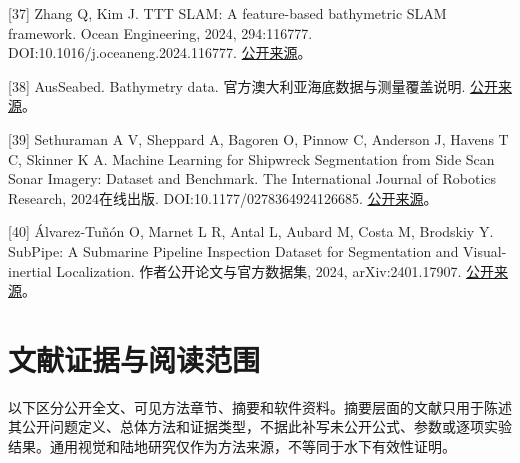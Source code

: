 {[}37{]} Zhang Q, Kim J. TTT SLAM: A feature-based bathymetric SLAM framework. Ocean Engineering, 2024, 294:116777. DOI:10.1016/j.oceaneng.2024.116777. \href{https://www.sciencedirect.com/science/article/pii/S0029801824001148}{公开来源}。

{[}38{]} AusSeabed. Bathymetry data. 官方澳大利亚海底数据与测量覆盖说明. \href{https://www.ausseabed.gov.au/data/bathymetry}{公开来源}。

{[}39{]} Sethuraman A V, Sheppard A, Bagoren O, Pinnow C, Anderson J, Havens T C, Skinner K A. Machine Learning for Shipwreck Segmentation from Side Scan Sonar Imagery: Dataset and Benchmark. The International Journal of Robotics Research, 2024在线出版. DOI:10.1177/0278364924126685. \href{https://arxiv.org/abs/2401.14546}{公开来源}。

{[}40{]} Álvarez-Tuñón O, Marnet L R, Antal L, Aubard M, Costa M, Brodskiy Y. SubPipe: A Submarine Pipeline Inspection Dataset for Segmentation and Visual-inertial Localization. 作者公开论文与官方数据集, 2024, arXiv:2401.17907. \href{https://github.com/remaro-network/SubPipe-dataset}{公开来源}。

\hypertarget{ux6587ux732eux8bc1ux636eux4e0eux9605ux8bfbux8303ux56f4}{%
\section{文献证据与阅读范围}\label{ux6587ux732eux8bc1ux636eux4e0eux9605ux8bfbux8303ux56f4}}

以下区分公开全文、可见方法章节、摘要和软件资料。摘要层面的文献只用于陈述其公开问题定义、总体方法和证据类型，不据此补写未公开公式、参数或逐项实验结果。通用视觉和陆地研究仅作为方法来源，不等同于水下有效性证明。

